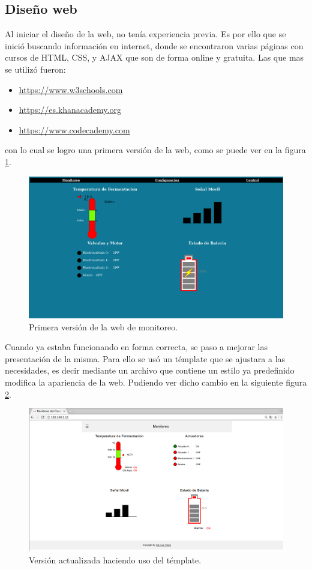 \subsection*{Diseño web}
Al iniciar el diseño de la web, no tenía experiencia previa. Es por ello que se inició buscando información en internet, donde se encontraron varias páginas con cursos de HTML, CSS, y AJAX que son de forma online y gratuita. Las que mas se utilizó fueron:
\begin{itemize}
  \item \url{https://www.w3schools.com}
  \item \url{https://es.khanacademy.org}
  \item \url{https://www.codecademy.com}
\end{itemize}
con lo cual se logro una primera versión de la web, como se puede ver en la figura \ref{fig:old_web}.
\begin{figure}[!htb]
  \centering
  \includegraphics[scale=.25]{./Figures/old_web.png}
  \caption{Primera versión de la web de monitoreo.}
  \label{fig:old_web}
\end{figure}

Cuando ya estaba funcionando en forma correcta, se paso a mejorar las presentación de la misma. Para ello se usó un témplate que se ajustara a las necesidades, es decir mediante un archivo que contiene un estilo ya predefinido modifica la apariencia de la web. Pudiendo ver dicho cambio en la siguiente figura \ref{fig:web_monitoreo}.

\begin{figure}[!h]
  \centering
  \includegraphics[scale=.25]{./Figures/web_monitoreo.png}
  \caption{Versión actualizada haciendo uso del témplate.}
  \label{fig:web_monitoreo}
\end{figure}

